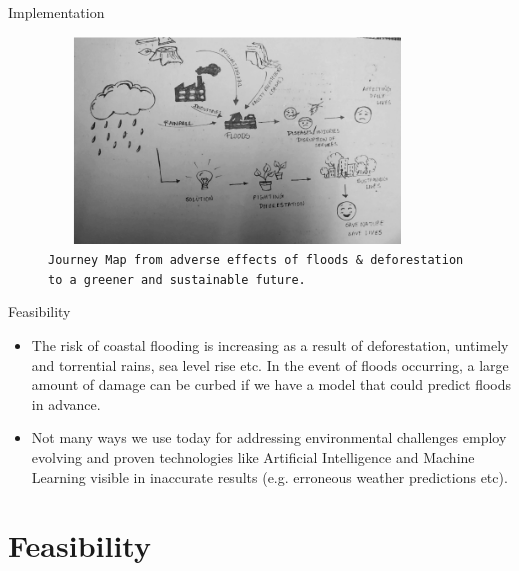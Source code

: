 \documentclass[10pt]{beamer}
\begin{document}
\begin{frame}{Implementation}
    \begin{block}{}
            \begin{figure}
	            \includegraphics[width=100mm,height=55mm]{journeymap.png}
	            {\tt Journey Map from adverse effects of floods \& deforestation to a greener and sustainable future.}
	            \label{fig:map}
            \end{figure}
    \end{block}
\end{frame}


\begin{frame}{Feasibility}
    \begin{block}{}
        \begin{itemize}
            \item The risk of coastal flooding is increasing as a result of deforestation, untimely and torrential rains, sea level rise etc. In the event of floods occurring, a large amount of damage can be curbed if we have a model that could predict floods in advance. 
            \item Not many ways we use today for addressing environmental challenges employ evolving and proven technologies like Artificial Intelligence and Machine Learning visible in inaccurate results (e.g. erroneous weather predictions etc). 

         \end{itemize}
    \end{block}
\end{frame}



\section{Feasibility}
\end{document}
